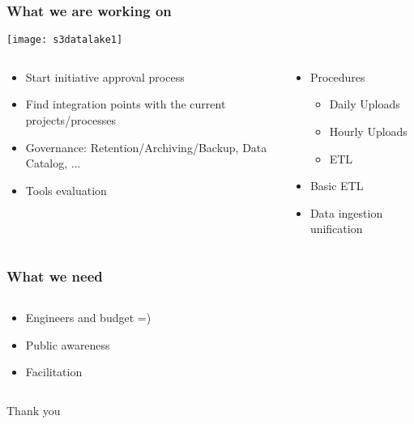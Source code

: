 \documentclass[aspectratio=169, 15pt,usenames,dvipsnames]{beamer}
\begin{document}
\begin{frame}
  \frametitle{What we are working on}
	\centering\texttt{[image: s3datalake1]} \\
  \centering\large
  \begin{columns}
	\begin{column}{0.7\textwidth}
	  \begin{itemize}
		\item Start initiative approval process
		\item Find integration points with the current projects/processes
		\item Governance: Retention/Archiving/Backup, Data Catalog, ...
		\item Tools evaluation
	  \end{itemize}
	\end{column}
	\pause
	\begin{column}{0.3\textwidth}
	  \begin{itemize}
		\item Procedures
			  \begin{itemize}
				\item Daily Uploads
				\item Hourly Uploads
        \item ETL
			  \end{itemize}
		\item Basic ETL
		\item Data ingestion unification
	  \end{itemize}
	\end{column}
  \end{columns}
\end{frame}
\begin{frame}
  \centering\LARGE
  \frametitle{What we need}
  \begin{columns}
    \begin{column}{0.8\textwidth}
      \begin{itemize}
        \item Engineers and budget =)
        \item Public awareness
        \item Facilitation
      \end{itemize}
    \end{column}
  \end{columns}
\end{frame}
\begin{frame}
  \centering\LARGE
  Thank you
\end{frame}
\end{document}

